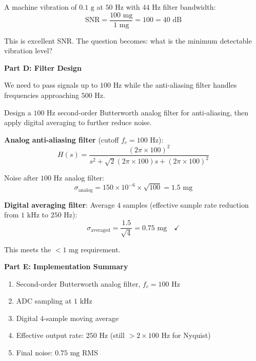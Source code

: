 \begin{example}
A machine vibration of $0.1\text{ g}$ at $50\text{ Hz}$ with $44\text{ Hz}$ filter bandwidth:
\begin{equation}
\text{SNR} = \frac{100\text{ mg}}{1\text{ mg}} = 100 = 40\text{ dB}
\end{equation}

This is excellent SNR. The question becomes: what is the minimum detectable vibration level?

\textbf{Part D: Filter Design}

We need to pass signals up to $100\text{ Hz}$ while the anti-aliasing filter handles frequencies approaching $500\text{ Hz}$.

Design a $100\text{ Hz}$ second-order Butterworth analog filter for anti-aliasing, then apply digital averaging to further reduce noise.

\textbf{Analog anti-aliasing filter} (cutoff $f_c = 100\text{ Hz}$):
\begin{equation}
H(s) = \frac{(2\pi \times 100)^2}{s^2 + \sqrt{2}(2\pi \times 100)s + (2\pi \times 100)^2}
\end{equation}

Noise after $100\text{ Hz}$ analog filter:
\begin{equation}
\sigma_{\text{analog}} = 150 \times 10^{-6} \times \sqrt{100} = 1.5\text{ mg}
\end{equation}

\textbf{Digital averaging filter}: Average $4$ samples (effective sample rate reduction from $1\text{ kHz}$ to $250\text{ Hz}$):
\begin{equation}
\sigma_{\text{averaged}} = \frac{1.5}{\sqrt{4}} = 0.75\text{ mg} \quad \checkmark
\end{equation}

This meets the $<1\text{ mg}$ requirement.

\textbf{Part E: Implementation Summary}

\begin{enumerate}
    \item Second-order Butterworth analog filter, $f_c = 100\text{ Hz}$
    \item ADC sampling at $1\text{ kHz}$
    \item Digital $4$-sample moving average
    \item Effective output rate: $250\text{ Hz}$ (still $>2 \times 100\text{ Hz}$ for Nyquist)
    \item Final noise: $0.75\text{ mg}$ RMS
\end{enumerate}
\end{example}

